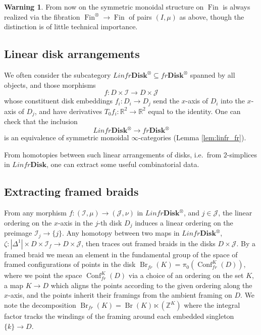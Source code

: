 \documentclass[reqno]{amsart}
\theoremstyle{definition}
\newtheorem{warning}[lemma]{Warning}
\newcommand{\mcl}[1]{\mathcal{#1}}
\newcommand{\opn}[1]{\operatorname{#1}}
\newcommand{\ot}{\otimes}
\newcommand{\Disk}{\mathbf{Disk}}
\DeclareMathOperator{\Fin}{Fin}
\renewcommand{\1}{\mathbf{1}}
\begin{document}
\begin{warning}
From now on the symmetric monoidal structure on $\Fin$ is always realized via the fibration $\Fin^{\ot}\to \Fin$ of pairs $(I,\mu)$ as above, though the distinction is of little technical importance.
\end{warning}

\subsection{Linear disk arrangements}

We often consider the subcategory $Linfr\Disk^{\ot}\subseteq fr\Disk^{\ot}$ spanned by all objects, and those morphisms
\[
f:D\times\mcl{I}\to D\times \mcl{J}
\]
whose constituent disk embeddings $f_i:D_i\to D_j$ send the $x$-axis of $D_i$ into the $x$-axis of $D_j$, and have derivatives $T_0f_i:\mathbb{R}^2\to \mathbb{R}^2$ equal to the identity.  One can check that the inclusion
\[
Linfr\Disk^{\ot}\to fr\Disk^{\ot}
\]
is an equivalence of symmetric monoidal $\infty$-categories (Lemma \ref{lem:linfr_fr}).
\par

From homotopies between such linear arrangements of disks, i.e.\ from $2$-simplices in $Linfr\Disk$, one can extract some useful combinatorial data.

\subsection{Extracting framed braids}
\label{sect:braids}

From any morphism $f:(\mcl{I},\mu)\to (\mcl{J},\nu)$ in $Linfr\Disk^{\ot}$, and $j\in \mcl{J}$, the linear ordering on the $x$-axis in the $j$-th disk $D_j$ induces a linear ordering on the preimage $\mcl{I}_j\to \{j\}$. Any homotopy between two maps in $Linfr\Disk^{\ot}$, $\zeta:|\Delta^1|\times D\times \mcl{I}_f\to D\times\mcl{J}$, then traces out framed braids in the disks $D\times\mcl{J}$.  By a framed braid we mean an element in the fundamental group of the space of framed configurations of points in the disk $\opn{Br}_{fr}(K)=\pi_0(\opn{Conf}^K_{fr}(D))$, where we point the space $\opn{Conf}^K_{fr}(D)$ via a choice of an ordering on the set $K$, a map $K\to D$ which aligns the points according to the given ordering along the $x$-axis, and the points inherit their framings from the ambient framing on $D$. We note the decomposition $\opn{Br}_{fr}(K)=\opn{Br}(K)\ltimes(\mathbb{Z}^{K})$ where the integral factor tracks the windings of the framing around each embedded singleton $\{k\}\to D$.
\end{document}
